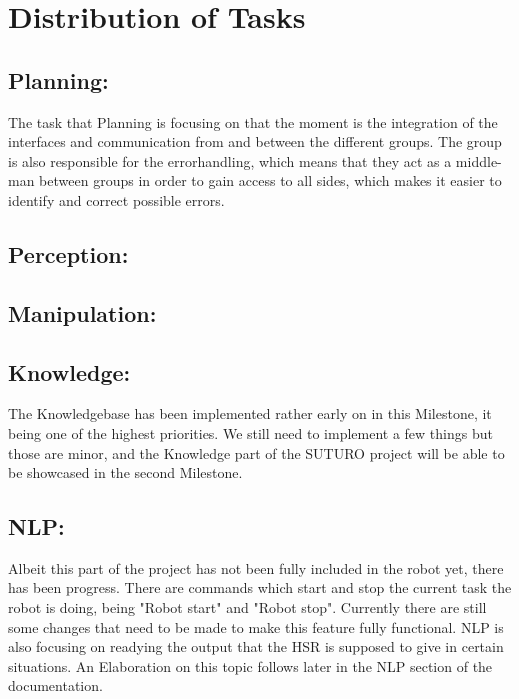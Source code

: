 \documentclass[main.tex]{subfiles}
\begin{document}
	
	\chapter{Distribution of Tasks}

		\section{Planning:}
		The task that Planning is focusing on that the moment is the integration of the interfaces and communication from and between the different groups. The group is also responsible for the errorhandling, which means that they act as a middle-man between groups in order to gain access to all sides, which makes it easier to identify and correct possible errors.
		
		\section{Perception:}
		
		
		\section{Manipulation:}
		
		
		\section{Knowledge:}
		The Knowledgebase has been implemented rather early on in this Milestone, it being one of the highest priorities. We still need to implement a few things but those are minor, and the Knowledge part of the SUTURO project will be able to be showcased in the second Milestone. 
		
		\section{NLP:}
		Albeit this part of the project has not been fully included in the robot yet, there has been progress. There are commands which start and stop the current task the robot is doing, being "Robot start" and "Robot stop". Currently there are still some changes that need to be made to make this feature fully functional. NLP is also focusing on readying the output that the HSR is supposed to give in certain situations. An Elaboration on this topic follows later in the NLP section of the documentation.  
\end{document}
